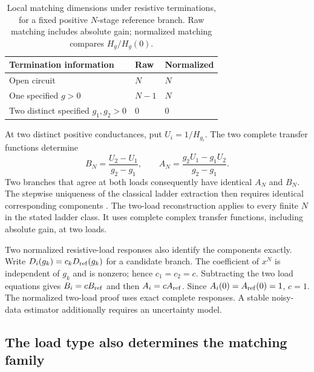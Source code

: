 \begin{table}[htbp]
\centering
\caption{Local matching dimensions under resistive terminations, for a fixed positive $N$-stage reference branch. Raw matching includes absolute gain; normalized matching compares $H_g/H_g(0)$.}
\label{tab:matching-conventions}
\begin{tabular}{lll}
\toprule
Termination information & Raw & Normalized \\
\midrule
Open circuit & $N$ & $N$ \\
One specified $g>0$ & $N-1$ & $N$ \\
Two distinct specified $g_1,g_2>0$ & $0$ & $0$ \\
\bottomrule
\end{tabular}
\end{table}

At two distinct positive conductances, put $U_i=1/H_{g_i}$. The two complete transfer functions determine
\begin{equation}\label{eq:general-two-load}
B_N=\frac{U_2-U_1}{g_2-g_1},\qquad
A_N=\frac{g_2U_1-g_1U_2}{g_2-g_1}.
\end{equation}
Two branches that agree at both loads consequently have identical $A_N$ and $B_N$. The stepwise uniqueness of the classical ladder extraction then requires identical corresponding components \citep{guillemin1949rcsynthesis}. The two-load reconstruction applies to every finite $N$ in the stated ladder class. It uses complete complex transfer functions, including absolute gain, at two loads.

Two normalized resistive-load responses also identify the components exactly. Write $D_i(g_k)=c_kD_{\rm ref}(g_k)$ for a candidate branch. The coefficient of $x^N$ is independent of $g_k$ and is nonzero; hence $c_1=c_2=c$. Subtracting the two load equations gives $B_i=cB_{\rm ref}$ and then $A_i=cA_{\rm ref}$. Since $A_i(0)=A_{\rm ref}(0)=1$, $c=1$. The normalized two-load proof uses exact complete responses. A stable noisy-data estimator additionally requires an uncertainty model.

\subsection{The load type also determines the matching family}

